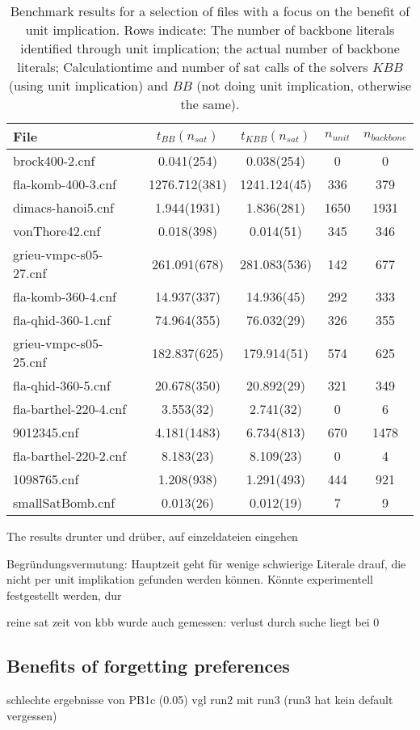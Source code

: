 \begin{table} %
\begin{tabular}{l| c c c c }
File & $t_{BB}(n_{sat})$ & $t_{KBB}(n_{sat})$ & $n_{unit}$ & $n_{backbone}$  \\
\hline
brock400-2.cnf & 0.041(254) & 0.038(254) & 0 & 0 \\
fla-komb-400-3.cnf & 1276.712(381) & 1241.124(45) & 336 & 379 \\
dimacs-hanoi5.cnf & 1.944(1931) & 1.836(281) & 1650 & 1931 \\
vonThore42.cnf & 0.018(398) & 0.014(51) & 345 & 346 \\
grieu-vmpc-s05-27.cnf & 261.091(678) & 281.083(536) & 142 & 677 \\
fla-komb-360-4.cnf & 14.937(337) & 14.936(45) & 292 & 333 \\
fla-qhid-360-1.cnf & 74.964(355) & 76.032(29) & 326 & 355 \\
grieu-vmpc-s05-25.cnf & 182.837(625) & 179.914(51) & 574 & 625 \\
fla-qhid-360-5.cnf & 20.678(350) & 20.892(29) & 321 & 349 \\
fla-barthel-220-4.cnf & 3.553(32) & 2.741(32) & 0 & 6 \\
9012345.cnf & 4.181(1483) & 6.734(813) & 670 & 1478 \\
fla-barthel-220-2.cnf & 8.183(23) & 8.109(23) & 0 & 4 \\
1098765.cnf & 1.208(938) & 1.291(493) & 444 & 921 \\
smallSatBomb.cnf & 0.013(26) & 0.012(19) & 7 & 9 \\
\end{tabular}
\caption{Benchmark results for a selection of files with a focus on the benefit of unit implication.
Rows indicate: The number of backbone literals identified through unit implication; the actual number of backbone literals; Calculationtime and number of sat calls of the solvers $KBB$ (using unit implication) and $BB$ (not doing unit implication, otherwise the same).}
\label{tab:bbkbb} %
\end{table}



The results drunter und drüber, auf einzeldateien eingehen

Begründungsvermutung: Hauptzeit geht für wenige schwierige Literale drauf, die nicht per unit implikation gefunden werden können. Könnte experimentell festgestellt werden, dur



reine sat zeit von kbb wurde auch gemessen: verlust durch suche liegt bei 0




\subsection{Benefits of forgetting preferences}
schlechte ergebnisse von PB1c (0.05) vgl run2 mit run3 (run3 hat kein default vergessen)

